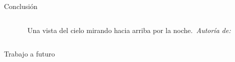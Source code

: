 \begin{frame}{Conclusión}
\begin{columns}
\begin{column}{0.4\textwidth}
\begin{figure}[H]
{                }
                \vspace{-0.25cm}
                \caption{\tiny~Una vista del cielo mirando hacia arriba por la noche.~\textit{Autoría de:}~\cite{dyer_cielo_nocturno_2021}}%
                \label{fig:Matplotlib_logo}
            \end{figure}
        \end{column}
    \end{columns}
\end{frame}

\begin{frame}{Trabajo a futuro}
    \begin{columns}
        \begin{column}{0.4\textwidth}
            \centering
            \begin{figure}[H]
                \centering
\end{figure}
\end{column}
\end{columns}
\end{frame}
